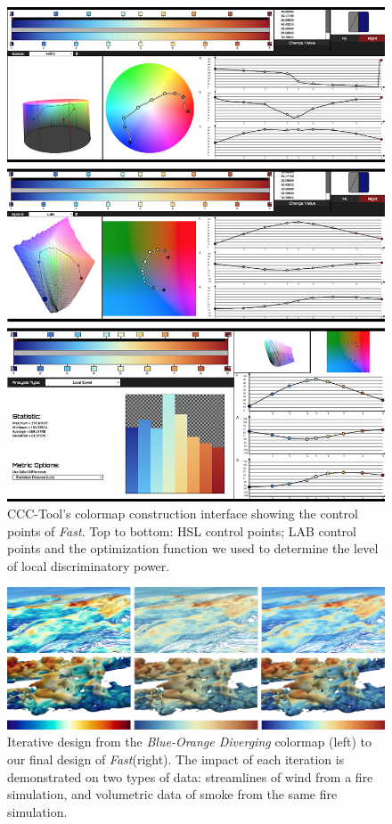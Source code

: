\documentclass{IEEEcsmag}
\newcommand*{\colormap}[1]{\textsl{#1}\xspace}
\newcommand*{\blueorange}{\colormap{Blue-Orange Diverging}}
\newcommand*{\fast}{\colormap{Fast}}
\begin{document}
\begin{figure}[t]
\includegraphics[width=\columnwidth]{Final_Pics/30F_combo.png}
\centering
\caption{CCC-Tool's colormap construction interface showing the control points of \fast. Top to bottom: HSL control points; LAB control points and the optimization function we used to determine the level of local discriminatory power.}
\label{CCC1}
\end{figure}

\begin{figure}[t]
  \centering
  \includegraphics[width=\textwidth]{Final_Pics/Compare22.png}
  \caption{
    Iterative design from the \blueorange colormap (left) to our final design of \fast (right).
    The impact of each iteration is demonstrated on two types of data: streamlines of wind from a fire simulation, and volumetric data of smoke from the same fire simulation.}
\label{fig:iterations}
\end{figure}
\end{document}
